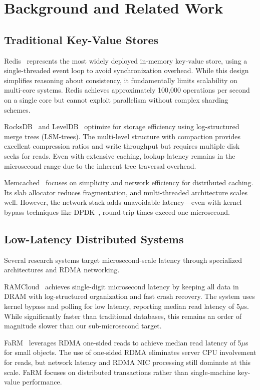 \documentclass[10pt,conference]{IEEEtran}
\begin{document}
\section{Background and Related Work}
\label{sec:background}

\subsection{Traditional Key-Value Stores}

Redis~\cite{redis} represents the most widely deployed in-memory key-value store, using a single-threaded event loop to avoid synchronization overhead. While this design simplifies reasoning about consistency, it fundamentally limits scalability on multi-core systems. Redis achieves approximately 100,000 operations per second on a single core but cannot exploit parallelism without complex sharding schemes.

RocksDB~\cite{rocksdb} and LevelDB~\cite{leveldb} optimize for storage efficiency using log-structured merge trees (LSM-trees). The multi-level structure with compaction provides excellent compression ratios and write throughput but requires multiple disk seeks for reads. Even with extensive caching, lookup latency remains in the microsecond range due to the inherent tree traversal overhead.

Memcached~\cite{memcached} focuses on simplicity and network efficiency for distributed caching. Its slab allocator reduces fragmentation, and multi-threaded architecture scales well. However, the network stack adds unavoidable latency—even with kernel bypass techniques like DPDK~\cite{dpdk}, round-trip times exceed one microsecond.

\subsection{Low-Latency Distributed Systems}

Several research systems target microsecond-scale latency through specialized architectures and RDMA networking.

RAMCloud~\cite{ramcloud} achieves single-digit microsecond latency by keeping all data in DRAM with log-structured organization and fast crash recovery. The system uses kernel bypass and polling for low latency, reporting median read latency of 5$\mu$s. While significantly faster than traditional databases, this remains an order of magnitude slower than our sub-microsecond target.

FaRM~\cite{farm} leverages RDMA one-sided reads to achieve median read latency of 5$\mu$s for small objects. The use of one-sided RDMA eliminates server CPU involvement for reads, but network latency and RDMA NIC processing still dominate at this scale. FaRM focuses on distributed transactions rather than single-machine key-value performance.
\end{document}
